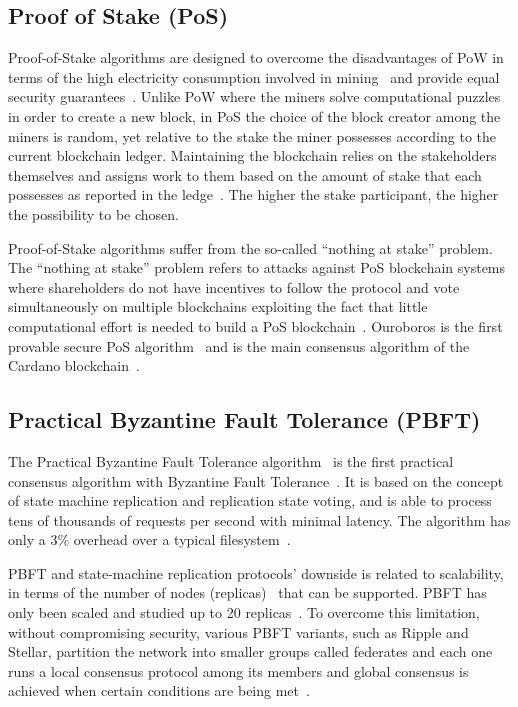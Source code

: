 \subsection{Proof of Stake (PoS)}\label{blockchain:consensus:pos}

Proof-of-Stake algorithms are designed to overcome the disadvantages of PoW in terms of the high electricity consumption involved in mining~\cite{bl_consensus}
and provide equal security guarantees~\cite{Kiayias2017}. Unlike PoW where the miners solve computational puzzles in order to create a new block, in PoS the choice
of the block creator among the miners is random, yet relative to the stake the miner possesses according to the current blockchain ledger. Maintaining
the blockchain relies on the stakeholders themselves and assigns work to them based on the amount of stake that each possesses as reported in the ledge~\cite{Kiayias2017}.
The higher the stake participant, the higher the possibility to be chosen.

Proof-of-Stake algorithms suffer from the so-called “nothing at stake” problem.
The “nothing at stake” problem refers to attacks against PoS blockchain systems where shareholders do not have
incentives to follow the protocol and vote simultaneously on multiple blockchains exploiting the fact that little computational effort
is needed to build a PoS blockchain~\cite{Kiayias2017}. Ouroboros is the first provable secure PoS algorithm~\cite{Kiayias2017} and is the main consensus algorithm of the Cardano blockchain~\cite{cardano_site}.

\subsection{Practical Byzantine Fault Tolerance (PBFT)}\label{blockchain:consensus:PBFT}

The Practical Byzantine Fault Tolerance algorithm~\cite{Castro:1999:PBF:296806.296824} is the first practical consensus algorithm with Byzantine Fault Tolerance~\cite{wiki:byzantine_fault_tolerance}.
It is based on the concept of state machine replication and replication state voting, and is able to process tens of thousands of requests per second with minimal latency.
The algorithm has only a 3\% overhead over a typical filesystem~\cite{Castro:1999:PBF:296806.296824}.

PBFT and state-machine replication protocols’ downside is related to scalability, in terms of the number of nodes (replicas)~\cite{Vukolić2016} that can be supported.
PBFT has only been scaled and studied up to 20 replicas~\cite{bl_consensus,Vukolić2016}. To overcome this limitation, without compromising security, various PBFT variants,
such as Ripple and Stellar, partition the network into smaller groups called federates and each one runs a local consensus protocol among its members and
global consensus is achieved when certain conditions are being met~\cite{DBLP:journals/corr/abs-1708-05665}.


